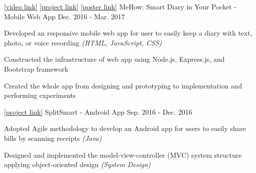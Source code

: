 \documentclass[13pt, a4paper]{awesome-cv}
\begin{document}
\begin{cventries}
    \cventry
        {
            \href{https://www.youtube.com/watch?v=ICQDMVz0Bzg}{[video link]}
            \href{https://github.com/ssvictorlin/MeHow}{[project link]}
            \href{http://140.112.91.208/~joannewolf/poster_MeHow.pdf}{[poster link]}
        }
        {MeHow: Smart Diary in Your Pocket - Mobile Web App}
        {}
        {Dec. 2016 - Mar. 2017}
        {
        \begin{cvitems}
            \item {Developed an responsive mobile web app for user to easily keep a diary with text, photo, or voice recording \textit{(HTML, JavaScript, CSS)}}
            \item {Constructed the infrastructure of web app using Node.js, Express.js, and Bootstrap framework}
            \item {Created the whole app from designing and prototyping to implementation and performing experiments}
        \end{cvitems}
        }
    
    \cventry
        {
            \href{https://github.com/LouisNW/CSE210_SplitSmart}{[project link]}
        }
        {SplitSmart - Android App}
        {}
        {Sep. 2016 - Dec. 2016}
        {
        \begin{cvitems}
            \item {Adopted Agile methodology to develop an Android app for users to easily share bills by scanning receipts \textit{(Java)}}
            \item {Designed and implemented the model-view-controller (MVC) system structure applying object-oriented design \textit{(System Design)}}
        \end{cvitems}
        }
    

\end{cventries}
\end{document}
